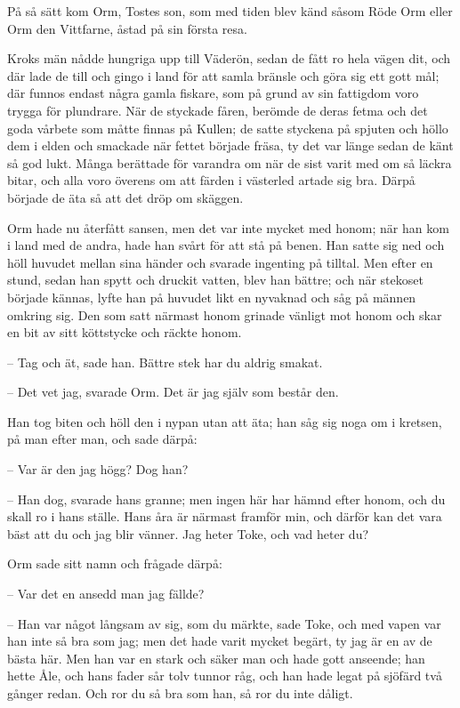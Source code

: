 \initial På så sätt kom Orm, Tostes son, som med tiden blev känd såsom Röde Orm eller Orm den Vittfarne, åstad på sin första resa.

%
%


\initial Kroks män nådde hungriga upp till Väderön, sedan de fått ro hela vägen dit, och där lade de till och gingo i land för att samla bränsle och göra sig ett gott mål; där funnos endast några gamla fiskare, som på grund av sin fattigdom voro trygga för plundrare. När de styckade fåren, berömde de deras fetma och det goda vårbete som måtte finnas på Kullen; de satte styckena på spjuten och höllo dem i elden och smackade när fettet började fräsa, ty det var länge sedan de känt så god lukt. Många berättade för varandra om när de sist varit med om så läckra bitar, och alla voro överens om att färden i västerled artade sig bra. Därpå började de äta så att det dröp om skäggen.

\initial Orm hade nu återfått sansen, men det var inte mycket med honom; när han kom i land med de andra, hade han svårt för att stå på benen. Han satte sig ned och höll huvudet mellan sina händer och svarade ingenting på tilltal. Men efter en stund, sedan han spytt och druckit vatten, blev han bättre; och när stekoset började kännas, lyfte han på huvudet likt en nyvaknad och såg på männen omkring sig. Den som satt närmast honom grinade vänligt mot honom och skar en bit av sitt köttstycke och räckte honom.

– Tag och ät, sade han. Bättre stek har du aldrig smakat.

– Det vet jag, svarade Orm. Det är jag själv som består den.

Han tog biten och höll den i nypan utan att äta; han såg sig noga om i kretsen, på man efter man, och sade därpå:

– Var är den jag högg? Dog han?

– Han dog, svarade hans granne; men ingen här har hämnd efter honom, och du skall ro i hans ställe. Hans åra är närmast framför min, och därför kan det vara bäst att du och jag blir vänner. Jag heter Toke, och vad heter du?

Orm sade sitt namn och frågade därpå:

– Var det en ansedd man jag fällde?

– Han var något långsam av sig, som du märkte, sade Toke, och med vapen var han inte så bra som jag; men det hade varit mycket begärt, ty jag är en av de bästa här. Men han var en stark och säker man och hade gott anseende; han hette Åle, och hans fader sår tolv tunnor råg, och han hade legat på sjöfärd två gånger redan. Och ror du så bra som han, så ror du inte dåligt.

